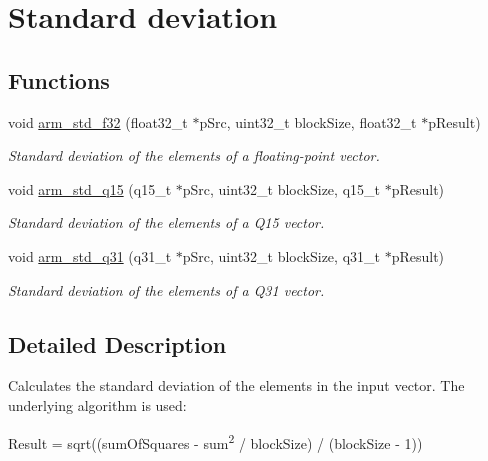 \hypertarget{group__STD}{}\section{Standard deviation}
\label{group__STD}
\subsection*{Functions}
\begin{DoxyCompactItemize}
\item 
void \hyperlink{group__STD_ga4969b5b5f3d001377bc401a3ee99dfc2}{arm\+\_\+std\+\_\+f32} (float32\+\_\+t $\ast$p\+Src, uint32\+\_\+t block\+Size, float32\+\_\+t $\ast$p\+Result)
\begin{DoxyCompactList}\small\item\em Standard deviation of the elements of a floating-\/point vector. \end{DoxyCompactList}\item 
void \hyperlink{group__STD_gaf9d27afa9928ff28a63cd98ea9218a72}{arm\+\_\+std\+\_\+q15} (q15\+\_\+t $\ast$p\+Src, uint32\+\_\+t block\+Size, q15\+\_\+t $\ast$p\+Result)
\begin{DoxyCompactList}\small\item\em Standard deviation of the elements of a Q15 vector. \end{DoxyCompactList}\item 
void \hyperlink{group__STD_ga39495e74f96116178be085c9dc7742f5}{arm\+\_\+std\+\_\+q31} (q31\+\_\+t $\ast$p\+Src, uint32\+\_\+t block\+Size, q31\+\_\+t $\ast$p\+Result)
\begin{DoxyCompactList}\small\item\em Standard deviation of the elements of a Q31 vector. \end{DoxyCompactList}\end{DoxyCompactItemize}


\subsection{Detailed Description}
Calculates the standard deviation of the elements in the input vector. The underlying algorithm is used\+:


\begin{DoxyPre}
  Result = sqrt((sumOfSquares - sum\textsuperscript{2} / blockSize) / (blockSize - 1))\end{DoxyPre}



